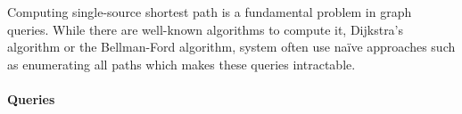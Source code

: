 
Computing single-source shortest path is a fundamental problem in graph queries. While there are well-known algorithms to compute it, \eg Dijkstra's algorithm or the Bellman-Ford algorithm, system often use na\"ive approaches such as enumerating all paths which makes these queries intractable.


\paragraph{Queries}
{\raggedright

}